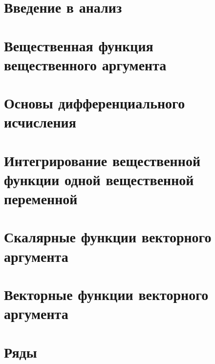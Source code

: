 
\LARGE


\tableofcontents %
\LARGE

\chapter{Введение в анализ}

\chapter{Вещественная функция вещественного аргумента}

\chapter{Основы дифференциального исчисления}

\chapter{Интегрирование вещественной функции одной вещественной переменной}

\chapter{Скалярные функции векторного аргумента}

\chapter{Векторные функции векторного аргумента}

\chapter{Ряды}


